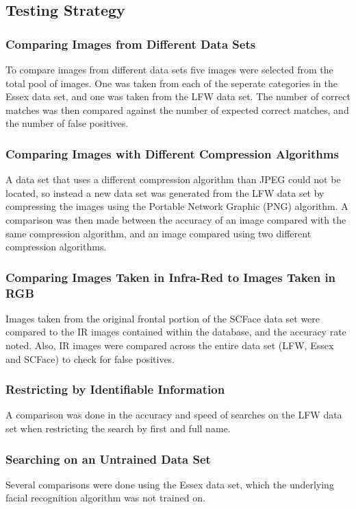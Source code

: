 \documentclass[12pt]{article}
\begin{document}
\subsection{Testing Strategy}
\subsubsection{Comparing Images from Different Data Sets}
To compare images from different data sets five images were selected from the total pool of images. One was taken from each of the seperate categories in the Essex data set, and one was taken from the LFW data set. The number of correct matches was then compared against the number of expected correct matches, and the number of false positives.

\subsubsection{Comparing Images with Different Compression Algorithms}
A data set that uses a different compression algorithm than JPEG could not be located, so instead a new data set was generated from the LFW data set by compressing the images using the Portable Network Graphic (PNG) algorithm. A comparison was then made between the accuracy of an image compared with the same compression algorithm, and an image compared using two different compression algorithms.

\subsubsection{Comparing Images Taken in Infra-Red to Images Taken in RGB}
Images taken from the original frontal portion of the SCFace data set were compared to the IR images contained within the database, and the accuracy rate noted. Also, IR images were compared across the entire data set (LFW, Essex and SCFace) to check for false positives.

\subsubsection{Restricting by Identifiable Information}
A comparison was done in the accuracy and speed of searches on the LFW data set when restricting the search by first and full name.

\subsubsection{Searching on an Untrained Data Set}
Several comparisons were done using the Essex data set, which the underlying facial recognition algorithm was not trained on.
\end{document}
